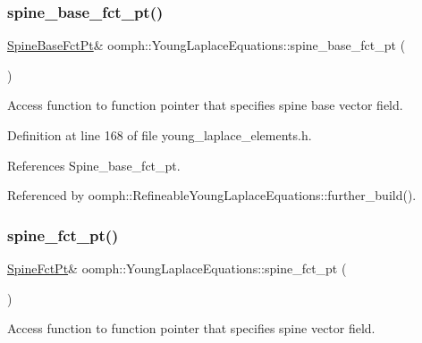 \subsubsection{\texorpdfstring{spine\+\_\+base\+\_\+fct\+\_\+pt()}{spine\_base\_fct\_pt()}}
{\footnotesize\ttfamily \hyperlink{classoomph_1_1YoungLaplaceEquations_a5e09288f5d3b710f23e8e57401a48ccc}{Spine\+Base\+Fct\+Pt}\& oomph\+::\+Young\+Laplace\+Equations\+::spine\+\_\+base\+\_\+fct\+\_\+pt (\begin{DoxyParamCaption}{ }\end{DoxyParamCaption})\hspace{0.3cm}{\ttfamily [inline]}}



Access function to function pointer that specifies spine base vector field. 



Definition at line 168 of file young\+\_\+laplace\+\_\+elements.\+h.



References Spine\+\_\+base\+\_\+fct\+\_\+pt.



Referenced by oomph\+::\+Refineable\+Young\+Laplace\+Equations\+::further\+\_\+build().

\mbox{\label{classoomph_1_1YoungLaplaceEquations_a8dbe47fba62678dba689f1f0202d9c96}} 
\subsubsection{\texorpdfstring{spine\+\_\+fct\+\_\+pt()}{spine\_fct\_pt()}}
{\footnotesize\ttfamily \hyperlink{classoomph_1_1YoungLaplaceEquations_a97448cfb2f6361e986d363d9e4463f9f}{Spine\+Fct\+Pt}\& oomph\+::\+Young\+Laplace\+Equations\+::spine\+\_\+fct\+\_\+pt (\begin{DoxyParamCaption}{ }\end{DoxyParamCaption})\hspace{0.3cm}{\ttfamily [inline]}}



Access function to function pointer that specifies spine vector field. 



